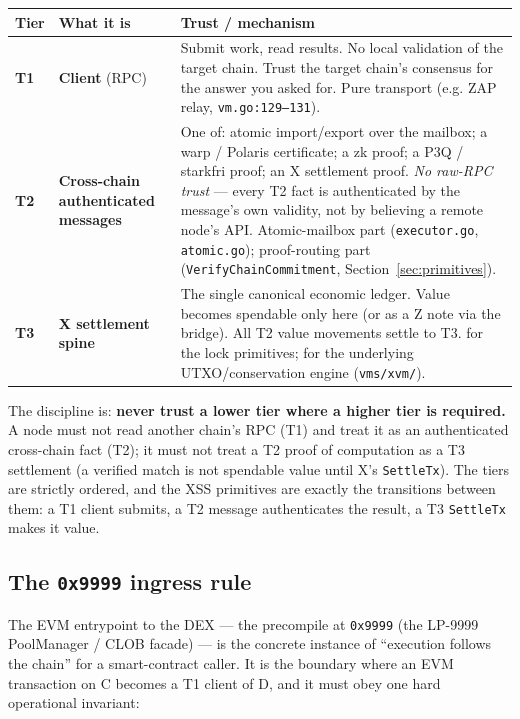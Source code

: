 \begin{center}
\begin{tabular}{@{}p{1.1cm}p{4.4cm}p{6.6cm}@{}}
\toprule
Tier & What it is & Trust / mechanism \\
\midrule
\textbf{T1} & \textbf{Client} (RPC) &
  Submit work, read results. No local validation of the target chain.
  Trust the target chain's consensus for the answer you asked for. Pure
  transport (e.g. ZAP relay, \texttt{vm.go:129--131}). \IMPL{} \\
\addlinespace
\textbf{T2} & \textbf{Cross-chain authenticated messages} &
  One of: atomic import/export over the mailbox; a warp / Polaris
  certificate; a zk proof; a P3Q / starkfri proof; an X settlement
  proof. \emph{No raw-RPC trust} --- every T2 fact is authenticated by
  the message's own validity, not by believing a remote node's API.
  Atomic-mailbox part \IMPL{} (\texttt{executor.go}, \texttt{atomic.go});
  proof-routing part \DESIGN{} (\texttt{VerifyChainCommitment},
  Section~\ref{sec:primitives}). \\
\addlinespace
\textbf{T3} & \textbf{X settlement spine} &
  The single canonical economic ledger. Value becomes spendable only
  here (or as a Z note via the bridge). All T2 value movements settle
  to T3. \DESIGN{} for the lock primitives; \IMPL{} for the underlying
  UTXO/conservation engine (\texttt{vms/xvm/}). \\
\bottomrule
\end{tabular}
\end{center}

\noindent The discipline is: \textbf{never trust a lower tier where a
higher tier is required.} A node must not read another chain's RPC (T1)
and treat it as an authenticated cross-chain fact (T2); it must not
treat a T2 proof of computation as a T3 settlement (a verified match is
not spendable value until X's \texttt{SettleTx}). The tiers are
strictly ordered, and the XSS primitives are exactly the transitions
between them: a T1 client submits, a T2 message authenticates the
result, a T3 \texttt{SettleTx} makes it value.

\subsection{The \texttt{0x9999} ingress rule}
\label{sec:ingress}

The EVM entrypoint to the DEX --- the precompile at \texttt{0x9999}
(the LP-9999 PoolManager / CLOB facade) --- is the concrete instance of
``execution follows the chain'' for a smart-contract caller. It is the
boundary where an EVM transaction on C becomes a T1 client of D, and it
must obey one hard operational invariant:

